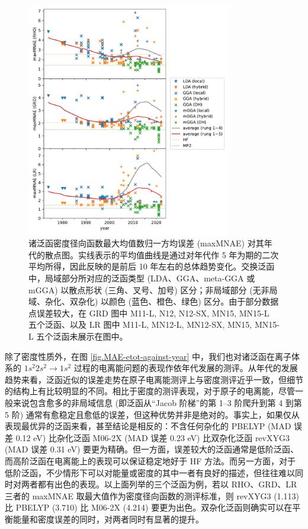\begin{figure}[tp]
    \centering
    \caption{诸泛函密度径向函数最大均值数归一方均误差 (maxMNAE) 对其年代的散点图。实线表示的平均值曲线是通过对年代作 5 年为期的二次平均所得，因此反映的是前后 10 年左右的总体趋势变化。交换泛函中，局域部分所对应的泛函类型 (LDA、GGA、meta-GGA 或 mGGA) 以散点形状 (三角、叉号、加号) 区分；非局域部分 (无非局域、杂化、双杂化) 以颜色 (蓝色、橙色、绿色) 区分。由于部分数据点误差较大，在 GRD 图中 M11-L, N12, N12-SX, MN15, MN15-L 五个泛函、以及 LR 图中 M11-L, MN12-L, MN12-SX, MN15, MN15-L 五个泛函未展示在图中。}
    \label{fig.maxMNAE-against-year}
    \includegraphics[width=0.8\textwidth]{assets/maxMNAE-against-year.pdf}
\end{figure}

除了密度性质外，在图 \ref{fig.MAE-etot-against-year} 中，我们也对诸泛函在离子体系的 $1s^2 2s^2 \rightarrow 1s^2$ 过程的电离能问题的表现作依年代发展的测评。从年代的发展趋势来看，泛函近似的误差走势在原子电离能测评上与密度测评近乎一致，但细节的结构上有比较明显的不同。相比于密度的测评表现，对于原子的电离能，尽管一般来说包含愈多的非局域信息 (即泛函从“Jacob 阶梯”的第 1--3 阶爬升到第 4 到第 5 阶) 通常有愈稳定且愈低的误差，但这种优势并非是绝对的。事实上，如果仅从表现最优异的泛函来看，甚至结论是相反的：不含任何杂化的 PBELYP (MAD 误差 0.12 eV) 比杂化泛函 M06-2X (MAD 误差 0.23 eV) 比双杂化泛函 revXYG3 (MAD 误差 0.31 eV) 要更为精确。但一方面，误差较大的泛函通常是低阶泛函、而高阶泛函在电离能上的表现可以保证稳定地好于 HF 方法。而另一方面，对于低阶泛函，不少情形下可以对能量或密度的其中一者有良好的描述，但往往难以同时对两者都有出色的表现。以上面列举的三个泛函为例，若以 RHO、GRD、LR 三者的 maxMNAE 取最大值作为密度径向函数的测评标准，则 revXYG3 (1.113) 比 PBELYP (3.710) 比 M06-2X (4.214) 要更为出色。双杂化泛函则确实可以在平衡能量和密度误差的同时，对两者同时有显著的提升。

